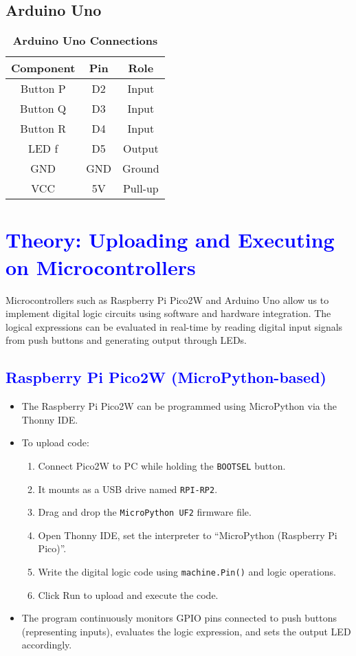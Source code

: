 \documentclass[twocolumn]{article}
\begin{document}
\subsection*{Arduino Uno}

\begin{table}[h]
\centering
\begin{tabular}{|c|c|c|}
\hline
Component & Pin & Role \\
\hline
Button P & D2 & Input \\
Button Q & D3 & Input \\
Button R & D4 & Input \\
LED f    & D5 & Output \\
GND      & GND & Ground \\
VCC      & 5V & Pull-up \\
\hline
\end{tabular}
\caption*{\textbf{Arduino Uno Connections}}
\end{table}

\section*{\textcolor{blue}{Theory: Uploading and Executing on Microcontrollers}}

Microcontrollers such as Raspberry Pi Pico2W and Arduino Uno allow us to implement digital logic circuits using software and hardware integration. The logical expressions can be evaluated in real-time by reading digital input signals from push buttons and generating output through LEDs.

\subsection*{\textcolor{blue}{Raspberry Pi Pico2W (MicroPython-based)}}

\begin{itemize}
    \item The Raspberry Pi Pico2W can be programmed using MicroPython via the Thonny IDE.
    \item To upload code:
    \begin{enumerate}
        \item Connect Pico2W to PC while holding the \texttt{BOOTSEL} button.
        \item It mounts as a USB drive named \texttt{RPI-RP2}.
        \item Drag and drop the \texttt{MicroPython UF2} firmware file.
        \item Open Thonny IDE, set the interpreter to “MicroPython (Raspberry Pi Pico)”.
        \item Write the digital logic code using \texttt{machine.Pin()} and logic operations.
        \item Click Run to upload and execute the code.
    \end{enumerate}
    \item The program continuously monitors GPIO pins connected to push buttons (representing inputs), evaluates the logic expression, and sets the output LED accordingly.
\end{itemize}
\end{document}
